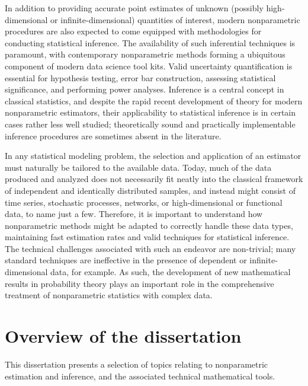 \documentclass[11pt,lof]{puthesis}
\theoremstyle{break}
\theoremstyle{proof}
\begin{document}
In addition to providing accurate point estimates of unknown (possibly
high-dimensional or infinite-dimensional) quantities of interest, modern
nonparametric procedures are also expected to come equipped with methodologies
for conducting statistical inference. The availability of such inferential
techniques is paramount, with contemporary nonparametric methods forming a
ubiquitous component of modern data science tool kits. Valid uncertainty
quantification is essential for hypothesis testing, error bar construction,
assessing statistical significance, and performing power analyses. Inference is
a central concept in classical statistics, and despite the rapid recent
development of theory for modern nonparametric estimators, their applicability
to statistical inference is in certain cases rather less well studied;
theoretically sound and practically implementable inference procedures are
sometimes absent in the literature.

In any statistical modeling problem, the selection and application of an
estimator must naturally be tailored to the available data. Today, much of the
data produced and analyzed does not necessarily fit neatly into the classical
framework of independent and identically distributed samples, and instead might
consist of time series, stochastic processes, networks, or high-dimensional or
functional data, to name just a few. Therefore, it is important to understand
how nonparametric methods might be adapted to correctly handle these data
types, maintaining fast estimation rates and valid techniques for statistical
inference. The technical challenges associated with such an endeavor are
non-trivial; many standard techniques are ineffective in the presence of
dependent or infinite-dimensional data, for example. As such, the development
of new mathematical results in probability theory plays an important role in
the comprehensive treatment of nonparametric statistics with complex data.

\section*{Overview of the dissertation}

This dissertation presents a selection of topics relating to nonparametric
estimation and inference, and the associated technical mathematical tools.
\end{document}

